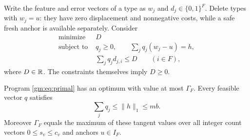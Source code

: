 Write the feature and error vectors of a type as $w_j$ and $d_j\in\{0,1\}^F$. Delete types with $w_j=u$: they have zero displacement and nonnegative costs, while a safe fresh anchor is available separately. Consider
\begin{equation}\label{gm:eq:primal}
\begin{aligned}
\text{minimize } &D\\
\text{subject to }&q_j\ge0,\qquad
\sum_jq_j(w_j-u)=h,\\
&\sum_jq_jd_{j,i}\le D\qquad(i\in F),
\end{aligned}
\end{equation}
where $D\in\mathbb R$. The constraints themselves imply $D\ge0$.

\begin{lemma}\label{gm:lem:tangent}
Program \eqref{gm:eq:primal} has an optimum with value at most $\Gamma_F$. Every feasible vector $q$ satisfies
\begin{equation}\label{gm:eq:mass-bound}
\sum_jq_j\le\|h\|_1\le mb.
\end{equation}
Moreover $\Gamma_F$ equals the maximum of these tangent values over all integer count vectors $0\le s_v\le c_v$ and anchors $u\in I_F$.
\end{lemma}

